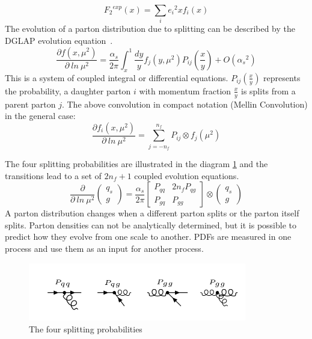 \begin{equation}
{{F}_2}^{exp} (x)= \sum_i {e_i}^2 x f_i(x)
\end{equation}
The evolution of a parton
distribution due to splitting can be described by the DGLAP
evolution equation~\cite{Ward:1995xy}. 
\begin{equation}
\frac{\partial f(x, \mu^2) }{\partial \: ln \:\mu^2}=
\frac{\alpha_s}{2\pi}\int_{x}^{1}\frac{dy}{y} f_j(y, \mu^2) P_{ij}(\frac{x}{y})+O({\alpha_s}^2)
\end{equation}
This is a system of coupled integral or differential equations. $ P_{ij}(\frac{x}{y}) $ represents the probability, a daughter parton $ i $ with momentum fraction $ \frac{x}{y} $ is splits from a parent parton $ j $.
The above convolution in compact notation (Mellin Convolution) in the general case:
\begin{equation}
\frac{\partial f_i(x, \mu^2) }{\partial \: ln \:\mu^2}=
\sum_{j=-n_f}^{n_f} P_{ij} \otimes f_j(\mu^2)
\end{equation}

The four splitting probabilities are illustrated in the diagram \ref{splitting} and the transitions lead to a set of $ 2n_f +1 $ coupled evolution equations.
\begin{equation}
\frac{\partial }{\partial \: ln \:\mu^2} \left(\begin{array}{c}q_s\\ g\end{array}\right)=
\frac{\alpha_s}{2\pi}\begin{bmatrix}P_{qq} & 2n_fP_{qg} \\P_{gq} & P_{gg} \end{bmatrix}\otimes\left(\begin{array}{c}q_s\\ g\end{array}\right)
\end{equation}
A parton distribution changes when a different parton splits or the parton itself splits. Parton densities can not be analytically determined, but it is possible to predict how they evolve from one scale to another. PDFs are measured in one process and use them as an input for another process.
\begin{figure}[h!]
\centering
\includegraphics[width=0.85\textwidth]{images/Intro/spiliting.png}
\caption{The four splitting probabilities}
\label{splitting}
\end{figure}

